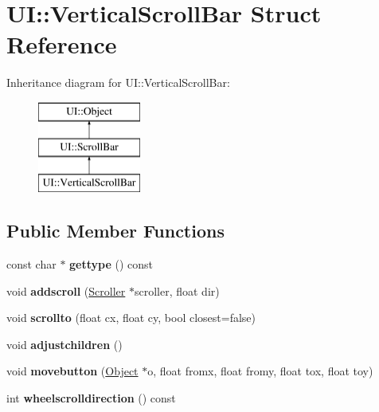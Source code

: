 \hypertarget{struct_u_i_1_1_vertical_scroll_bar}{}\section{UI\+:\+:Vertical\+Scroll\+Bar Struct Reference}
\label{struct_u_i_1_1_vertical_scroll_bar}
Inheritance diagram for UI\+:\+:Vertical\+Scroll\+Bar\+:\begin{figure}[H]
\begin{center}
\leavevmode
\includegraphics[height=3.000000cm]{struct_u_i_1_1_vertical_scroll_bar}
\end{center}
\end{figure}
\subsection*{Public Member Functions}
\begin{DoxyCompactItemize}
\item 
\mbox{\label{struct_u_i_1_1_vertical_scroll_bar_a17373f729b25e8d5ef7eaffdbe1e9376}} 
const char $\ast$ {\bfseries gettype} () const
\item 
\mbox{\label{struct_u_i_1_1_vertical_scroll_bar_a5e2bb432873313eeac66f250233761ab}} 
void {\bfseries addscroll} (\hyperlink{struct_u_i_1_1_scroller}{Scroller} $\ast$scroller, float dir)
\item 
\mbox{\label{struct_u_i_1_1_vertical_scroll_bar_ac3ceb9ecc6e26aa559f7aeb3f0d9025e}} 
void {\bfseries scrollto} (float cx, float cy, bool closest=false)
\item 
\mbox{\label{struct_u_i_1_1_vertical_scroll_bar_a40eb790960821375e310d388540ec0ee}} 
void {\bfseries adjustchildren} ()
\item 
\mbox{\label{struct_u_i_1_1_vertical_scroll_bar_a647d864309f9626261ec111adf2b0878}} 
void {\bfseries movebutton} (\hyperlink{struct_u_i_1_1_object}{Object} $\ast$o, float fromx, float fromy, float tox, float toy)
\item 
\mbox{\label{struct_u_i_1_1_vertical_scroll_bar_acabeb8575d7b0c5855c669eb4f24506a}} 
int {\bfseries wheelscrolldirection} () const
\end{DoxyCompactItemize}
